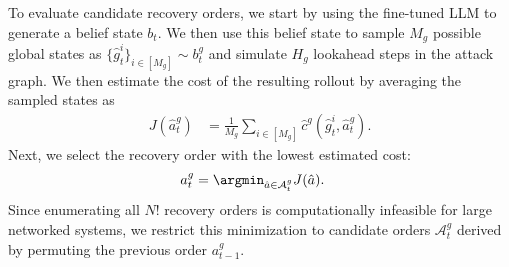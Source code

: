 \documentclass[sigconf]{acmart}
\begin{document}

To evaluate candidate recovery orders, we start by using the fine-tuned LLM to generate a belief state $b_t$. We then use this belief state to sample $M_g$ possible global states as $\{\hat{g}^i_t\}_{i \in [M_g]} \sim b^g_t$ and simulate $H_g$ lookahead steps in the attack graph. We then estimate the cost of the resulting rollout by averaging the sampled states as
\begin{align*}
J(\hat{a}^g_t) &= \frac{1}{M_g}\sum_{i \in [M_g]}\hat{c}^g(\hat{g}^i_t, \hat{a}^g_t). 
\end{align*}
Next, we select the recovery order with the lowest estimated cost:
\begin{align*}
a^g_t &= \argmin_{\hat{a} \in \mathcal{A}_t^g}J(\hat{a}).
\end{align*}
Since enumerating all $N!$ recovery orders is computationally infeasible for large networked systems, we restrict this minimization to candidate orders $\mathcal{A}^g_t$ derived by permuting the previous order $a^g_{t-1}$.

\end{document}
